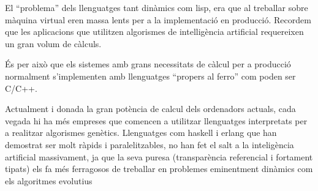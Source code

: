 El ``problema'' dels llenguatges tant dinàmics com lisp, era que al treballar sobre
màquina virtual eren massa lents per a la implementació en producció.  Recordem que les
aplicacions que utilitzen algorismes de intelligència artificial requereixen un
gran volum de càlculs.

És per això que els sistemes amb grans necessitats de càlcul per a producció
normalment s'implementen amb llenguatges ``propers al ferro'' com poden ser
C/C++. 

Actualment i donada la gran potència de calcul dels ordenadors actuals, cada
vegada hi ha més empreses que comencen a utilitzar llenguatges interpretats per
a realitzar algorismes genètics. Llenguatges com haskell i erlang que han
demostrat ser molt ràpids i paralelitzables, no han fet el salt a la
inteligència artificial massivament, ja que la seva puresa (transparència
referencial i fortament tipats) els fa més ferragosos de treballar en problemes
eminentment dinàmics com els algoritmes evolutius  





% 
%


%

